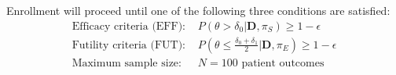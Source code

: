 \documentclass[12pt]{article}
\begin{document}
%
%



%				

Enrollment will proceed until one of the following three conditions are satisfied:
\begin{align*}
\text{Efficacy criteria (EFF): }&P(\theta>\delta_0|\mathbf{D},\pi_S)\geq 1-\epsilon %
\\
\text{Futility criteria (FUT): }&P\left(\theta \leq \frac{\delta_0+\delta_1}{2}\Big|\mathbf{D},\pi_E\right)\geq 1-\epsilon
\\
\text{Maximum sample size: }&N=100 \text{ patient outcomes}%
\end{align*}
\end{document}
